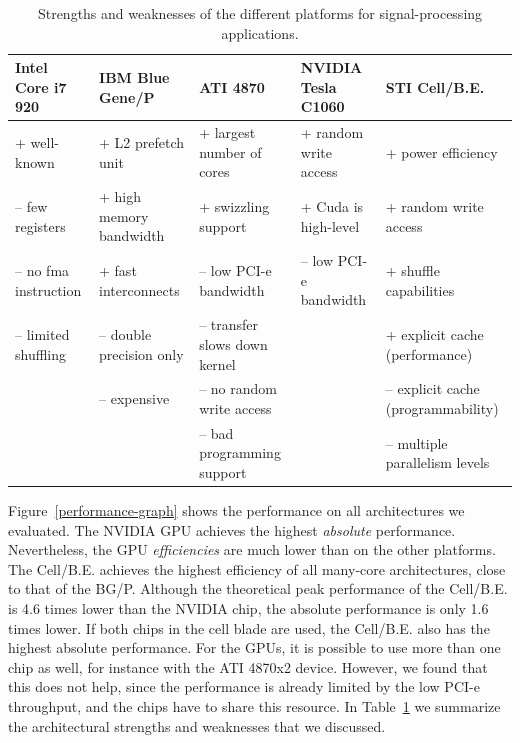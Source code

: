 \documentclass{article}
\begin{document}
\begin{table}[t]
\begin{center}
{\scriptsize %
\begin{tabular}{l|l|l|l|l}
Intel Core i7 920     & IBM Blue Gene/P          & ATI 4870                      & NVIDIA Tesla C1060     & STI  Cell/B.E.                      \\
\hline
 + well-known         &  + L2 prefetch unit      &  + largest number of cores    &  + random write access &  + power efficiency                 \\
-- few registers      &  + high memory bandwidth &  + swizzling support          &  + Cuda is high-level  &  + random write access              \\
-- no fma instruction &  + fast interconnects    & -- low PCI-e bandwidth        & -- low PCI-e bandwidth &  + shuffle capabilities             \\
-- limited shuffling  & -- double precision only & -- transfer slows down kernel &                        &  + explicit cache (performance)     \\
                      & -- expensive             & -- no random write access     &                        & -- explicit cache (programmability) \\
                      &                          & -- bad programming support    &                        & -- multiple parallelism levels      \\
\end{tabular}
} %
\end{center}
\vspace{-0.5cm}
\caption{Strengths and weaknesses of the different platforms for signal-processing applications.}
\label{architecture-results-table}
\end{table}

Figure~\ref{performance-graph} shows the performance on all
architectures we evaluated. The NVIDIA GPU achieves the highest
\emph{absolute} performance. Nevertheless, the GPU \emph{efficiencies}
are much lower than on the other platforms.  The \mbox{Cell/B.E.}
achieves the highest efficiency of all many-core architectures, close
to that of the BG/P. 
Although the theoretical peak performance of the
\mbox{Cell/B.E.} is 4.6 times lower than the NVIDIA chip, the absolute
performance is only 1.6 times lower.
 If both chips in the cell blade
are used, the \mbox{Cell/B.E.} also has the highest absolute
performance. For the GPUs, it is possible to use more than one chip as
well, for instance with the ATI 4870x2 device. However, we found that this does not help, since the
performance is already limited by the low PCI-e throughput, and the
chips have to share this resource.
In Table~\ref{architecture-results-table} we summarize the
architectural strengths and weaknesses that we discussed.  
\end{document}
